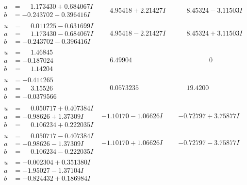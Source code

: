 \documentclass[1p]{elsarticle_modified}
\theoremstyle{definition}
\begin{document}
$$\begin{array}{c|c|c}
\begin{aligned}
a &= \phantom{-}1.173430 + 0.684067 I \\
b &= -0.243702 + 0.396416 I\end{aligned}
 & \phantom{-}4.95418 + 2.21427 I & \phantom{-}8.45324 - 3.11503 I \\ \hline\begin{aligned}
u &= \phantom{-}0.011225 - 0.631699 I \\
a &= \phantom{-}1.173430 - 0.684067 I \\
b &= -0.243702 - 0.396416 I\end{aligned}
 & \phantom{-}4.95418 - 2.21427 I & \phantom{-}8.45324 + 3.11503 I \\ \hline\begin{aligned}
u &= \phantom{-}1.46845\phantom{ +0.000000I} \\
a &= -0.187024\phantom{ +0.000000I} \\
b &= \phantom{-}1.14204\phantom{ +0.000000I}\end{aligned}
 & \phantom{-}6.49904\phantom{ +0.000000I} & \phantom{-0.000000 } 0 \\ \hline\begin{aligned}
u &= -0.414265\phantom{ +0.000000I} \\
a &= \phantom{-}3.15526\phantom{ +0.000000I} \\
b &= -0.0379566\phantom{ +0.000000I}\end{aligned}
 & \phantom{-}0.0573235\phantom{ +0.000000I} & \phantom{-}19.4200\phantom{ +0.000000I} \\ \hline\begin{aligned}
u &= \phantom{-}0.050717 + 0.407384 I \\
a &= -0.98626 + 1.37309 I \\
b &= \phantom{-}0.106234 + 0.222035 I\end{aligned}
 & -1.10170 - 1.06626 I & -0.72797 + 3.75877 I \\ \hline\begin{aligned}
u &= \phantom{-}0.050717 - 0.407384 I \\
a &= -0.98626 - 1.37309 I \\
b &= \phantom{-}0.106234 - 0.222035 I\end{aligned}
 & -1.10170 + 1.06626 I & -0.72797 - 3.75877 I \\ \hline\begin{aligned}
u &= -0.002304 + 0.351380 I \\
a &= -1.95027 - 1.37104 I \\
b &= -0.824432 + 0.186984 I\end{aligned}

\end{array}$$
\end{document}

